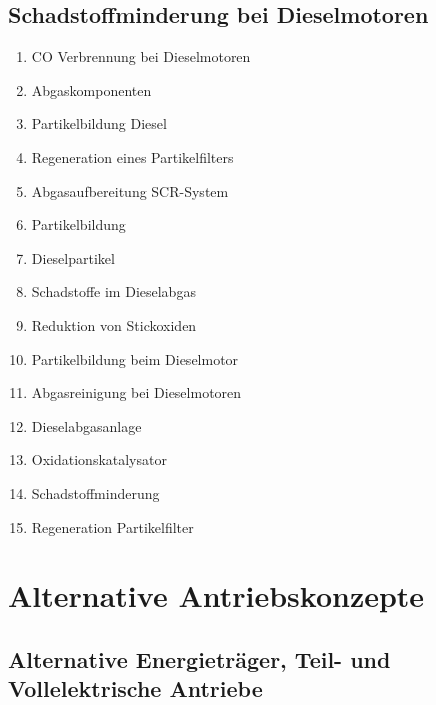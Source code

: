 \subsection{Schadstoffminderung bei
Dieselmotoren}\label{schadstoffminderung-bei-dieselmotoren}

\begin{enumerate}
\item
  CO Verbrennung bei Dieselmotoren\\
\item
  Abgaskomponenten\\
\item
  Partikelbildung Diesel\\
\item
  Regeneration eines Partikelfilters\\
\item
  Abgasaufbereitung SCR-System\\
\item
  Partikelbildung\\
\item
  Dieselpartikel\\
\item
  Schadstoffe im Dieselabgas\\
\item
  Reduktion von Stickoxiden\\
\item
  Partikelbildung beim Dieselmotor\\
\item
  Abgasreinigung bei Dieselmotoren\\
\item
  Dieselabgasanlage\\
\item
  Oxidationskatalysator\\
\item
  Schadstoffminderung\\
\item
  Regeneration Partikelfilter
\end{enumerate}

\section{Alternative
Antriebskonzepte}\label{alternative-antriebskonzepte-1}

\subsection{Alternative Energieträger, Teil- und Vollelektrische
Antriebe}\label{alternative-energietraeger-teil--und-vollelektrische-antriebe}

